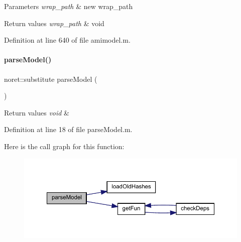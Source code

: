 \begin{DoxyParams}{Parameters}
{\em wrap\+\_\+path} & new wrap\+\_\+path\\
\hline
\end{DoxyParams}

\begin{DoxyRetVals}{Return values}
{\em wrap\+\_\+path} & void \\
\hline
\end{DoxyRetVals}


Definition at line 640 of file amimodel.\+m.

\mbox{\label{classamimodel_ae4172c2a8fac8b7c434f03274fcac6ac}} 
\paragraph{\texorpdfstring{parse\+Model()}{parseModel()}}
{\footnotesize\ttfamily noret\+::substitute parse\+Model (\begin{DoxyParamCaption}{ }\end{DoxyParamCaption})}


\begin{DoxyRetVals}{Return values}
{\em void} & \\
\hline
\end{DoxyRetVals}


Definition at line 18 of file parse\+Model.\+m.

Here is the call graph for this function\+:
\nopagebreak
\begin{figure}[H]
\begin{center}
\leavevmode
\includegraphics[width=350pt]{classamimodel_ae4172c2a8fac8b7c434f03274fcac6ac_cgraph}
\end{center}
\end{figure}
\mbox{\label{classamimodel_a73df9b3d523823e7a0105916471f13f5}} 
